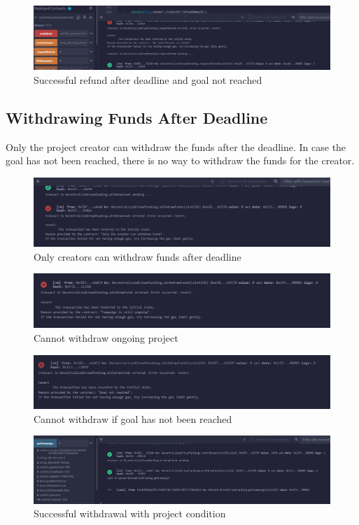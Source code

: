 \documentclass[12pt,reqno]{article}
\begin{document}
\begin{figure}[h!]
    \centering
    \includegraphics[width=0.6\linewidth]{Pictures/request_refund2.png}
    \caption{Successful refund after deadline and goal not reached}
    \label{refund2}
\end{figure}

\newpage
\subsection{Withdrawing Funds After Deadline}
Only the project creator can withdraw the funds after the deadline. 
In case the goal has not been reached, there is no way to withdraw 
the funds for the creator. 
\begin{figure}[h!]
    \centering
    \includegraphics[width=0.6\linewidth]{Pictures/withdraw_late1.png}
    \caption{Only creators can withdraw funds after deadline}
    \label{withdraw_late1}
\end{figure}

\begin{figure}[h!]
    \centering
    \includegraphics[width=0.6\linewidth]{Pictures/withdraw_late2.png}
    \caption{Cannot withdraw ongoing project}
    \label{withdraw_late2}
\end{figure}

\begin{figure}[h!]
    \centering
    \includegraphics[width=0.6\linewidth]{Pictures/withdraw_late3.png}
    \caption{Cannot withdraw if goal has not been reached}
    \label{withdraw_late3}
\end{figure}

\begin{figure}[h!]
    \centering
    \includegraphics[width=0.6\linewidth]{Pictures/withdraw_late4.png}
    \caption{Successful withdrawal with project condition}
    \label{withdraw_late4}
\end{figure}
\end{document}

